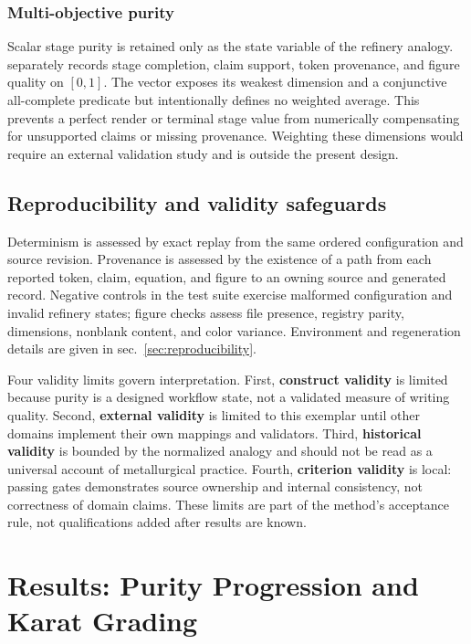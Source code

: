 \documentclass[
  english,
]{article}
\begin{document}
\subsubsection{Multi-objective purity}\label{multi-objective-purity}

Scalar stage purity is retained only as the state variable of the
refinery analogy.  separately
records stage completion, claim support, token provenance, and figure
quality on \([0,1]\). The vector exposes its weakest dimension and a
conjunctive all-complete predicate but intentionally defines no weighted
average. This prevents a perfect render or terminal stage value from
numerically compensating for unsupported claims or missing provenance.
Weighting these dimensions would require an external validation study
and is outside the present design.

\subsection{Reproducibility and validity
safeguards}\label{reproducibility-and-validity-safeguards}

Determinism is assessed by exact replay from the same ordered
configuration and source revision. Provenance is assessed by the
existence of a path from each reported token, claim, equation, and
figure to an owning source and generated record. Negative controls in
the test suite exercise malformed configuration and invalid refinery
states; figure checks assess file presence, registry parity, dimensions,
nonblank content, and color variance. Environment and regeneration
details are given in sec.~\ref{sec:reproducibility}.

Four validity limits govern interpretation. First, \textbf{construct
validity} is limited because purity is a designed workflow state, not a
validated measure of writing quality. Second, \textbf{external validity}
is limited to this exemplar until other domains implement their own
mappings and validators. Third, \textbf{historical validity} is bounded
by the normalized analogy and should not be read as a universal account
of metallurgical practice. Fourth, \textbf{criterion validity} is local:
passing gates demonstrates source ownership and internal consistency,
not correctness of domain claims. These limits are part of the method's
acceptance rule, not qualifications added after results are known.

\newpage

\section{Results: Purity Progression and Karat
Grading}\label{sec:results}
\end{document}

